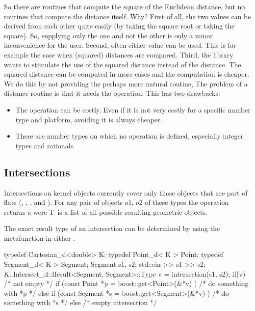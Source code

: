 So there are routines that compute the square of the Euclidean
distance, but no routines that compute the distance itself. Why?
First of all, the two values can be derived from each other quite
easily (by taking the square root or taking the square). So, supplying
only the one and not the other is only a minor inconvenience for the
user.  Second, often either value can be used. This is for example the
case when (squared) distances are compared.  Third, the library wants
to stimulate the use of the squared distance instead of the distance.
The squared distance can be computed in more cases and the computation
is cheaper.  We do this by not providing the perhaps more natural
routine, The problem of a distance routine is that it needs the
 operation.  This has two drawbacks:
\begin{itemize}
\item The  operation can be costly. Even if it is not
  very costly for a specific number type and platform, avoiding it is
  always cheaper.
\item There are number types on which no  operation is
  defined, especially integer types and rationals.
\end{itemize}

\subsection{Intersections}

Intersections on kernel objects currently cover only those objects
that are part of flats (, ,
, and ).  For any pair of objects
$o1$, $o2$ of these types the operation 
returns a 
were T\textellipsis\ is a list of all possible resulting geometric objects.

The exact result type of an intersection can be determined by using
the metafunction  in either
.

\ccExample 
\ccHtmlLinksOff%
\begin{cprog}
  typedef Cartesian_d<double> K;
  typedef Point_d< K >        Point;
  typedef Segment_d< K >      Segment;
  Segment s1, s2;
  std::cin >> s1 >> s2;
  K::Intersect_d::Result<Segment, Segment>::Type
    v = intersection(s1, s2);
  if(v) {
    /* not empty */
    if (const Point *p = boost::get<Point>(&*v) ) {
      /* do something with *p */
    } else if (const Segment *s = boost::get<Segment>(&*v) ) {
      /* do something with *s */
    }
  } else {
    /* empty intersection */
  }
\end{cprog}
\ccHtmlLinksOn%

